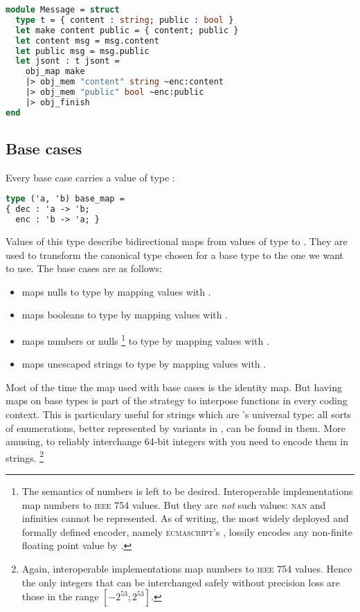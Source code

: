\documentclass[nolinenum]{jfp}
\begin{document}
\begin{lstlisting}[language=ocaml]
module Message = struct
  type t = { content : string; public : bool }
  let make content public = { content; public }
  let content msg = msg.content
  let public msg = msg.public
  let jsont : t jsont =
    obj_map make
    |> obj_mem "content" string ~enc:content
    |> obj_mem "public" bool ~enc:public
    |> obj_finish
end
\end{lstlisting}

\subsection{Base cases}
\label{sec:base_cases}

Every base case carries a value of type :
%
\begin{lstlisting}[language=ocaml]
type ('a, 'b) base_map =
{ dec : 'a -> 'b;
  enc : 'b -> 'a; }
\end{lstlisting}
%
Values of this type describe bidirectional maps from values of type
 to . They are used to transform the canonical \ml{}
type  chosen for a \json{} base type to the one we want to
use. The base cases are as follows:

\begin{itemize}
\item
{} maps \json{} nulls to type  by mapping
 values with .
%
\item
{} maps \json{} booleans to type  by mapping
 values with .
%
\item
{} maps \json{} numbers or
nulls%
\footnote{The semantics of \json{} numbers is left to be desired.
Interoperable \json{} implementations map \json{} numbers to
\textsc{ieee} 754  values. But they are \emph{not} such
values: \textsc{nan} and infinities cannot be represented. As of
writing, the most widely deployed and formally defined \json{}
encoder, namely \textsc{ecmascript}'s \mbox{}
\citep{ecmascript}, lossily encodes any non-finite floating point value by
.}
to type  by mapping  values with .
%
\item
{} maps unescaped \json{} strings to type  by
mapping  values with .
\end{itemize}

Most of the time the map  used with base cases is the identity
map. But having maps on base types is part of the strategy to
interpose functions in every coding context. This is particulary
useful for \json{} strings which are \json{}'s universal type: all
sorts of enumerations, better represented by variants in \ml{}, can be
found in them. More amusing, to reliably interchange \mbox{64-bit}
integers with \json{} you need to encode them in strings.%
\footnote{Again, interoperable \json{} implementations map
\json{} numbers to \textsc{ieee} 754  values. Hence the
only integers that can be interchanged safely without precision loss
are those in the range $[-2^{53};2^{53}]$.}
\end{document}
